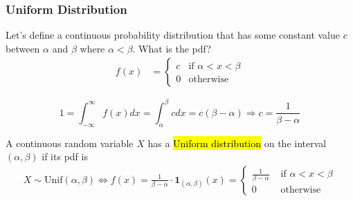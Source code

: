 \documentclass[slidestop,compress,mathserif]{beamer}
\begin{document}
\begin{frame}
\frametitle{Uniform Distribution}

Let's define a continuous probability distribution that has some constant value $c$ between $\alpha$ and $\beta$
where $\alpha < \beta$. What is the pdf?
\begin{align*}
f(x) &= \begin{cases}
c & \text{if $\alpha < x < \beta$} \\
0 & \text{otherwise}
\end{cases}
\end{align*}


\[1  = \int_{-\infty}^\infty f(x) dx =\int_{\alpha}^\beta c dx
 = c(\beta - \alpha) \Longrightarrow c = \frac{1}{\beta-\alpha} \]

\begin{defn}
A continuous random variable $X$ has a \hl{Uniform distribution} on the interval $(\alpha, \beta)$ if its pdf is
\vspace{-0.3cm}
\begin{align*}
X \sim \text{Unif}(\alpha, \beta) \Longleftrightarrow
 f(x) = \frac{1}{\beta-\alpha} \cdot \mathbf{1}_{(\alpha, \beta)}(x) =
\begin{cases}
\frac{1}{\beta-\alpha} & \text{ if } \alpha < x < \beta\\
0 & \text{ otherwise}
\end{cases}
\end{align*}
 \end{defn}

\end{frame}

\end{document}
